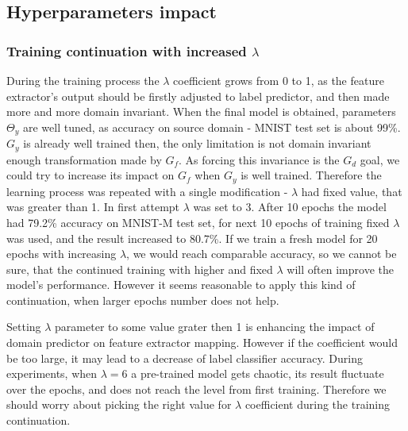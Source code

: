 \documentclass{article}
\begin{document}
\subsection{Hyperparameters impact}

\subsubsection{Training continuation with increased $\lambda$}
During the training process the $\lambda$ coefficient grows from 0 to 1, as the feature extractor's output should be firstly adjusted to label predictor, and then made more and more domain invariant. When the final model is obtained, parameters $\Theta_{y}$ are well tuned, as accuracy on source domain - MNIST test set is about 99\%. $G_{y}$ is already well trained then, the only limitation is not domain invariant enough transformation made by $G_{f}$. As forcing this invariance is the $G_{d}$ goal, we could try to increase its impact on $G_{f}$ when $G_{y}$ is well trained. Therefore the learning process was repeated with a single modification - $\lambda$ had fixed value, that was greater than 1. In first attempt $\lambda$ was set to 3. After 10 epochs the model had 79.2\% accuracy on MNIST-M test set, for next 10 epochs of training fixed $\lambda$ was used, and the result increased to 80.7\%. If we train a fresh model for 20 epochs with increasing $\lambda$, we would reach comparable accuracy, so we cannot be sure, that the continued training with higher and fixed $\lambda$ will often improve the model's performance. However it seems reasonable to apply this kind of continuation, when larger epochs number does not help.
\par
Setting $\lambda$ parameter to some value grater then 1 is enhancing the impact of domain predictor on feature extractor mapping. However if the coefficient would be too large, it may lead to a decrease of label classifier accuracy. During experiments, when $\lambda = 6$ a pre-trained model gets chaotic, its result fluctuate over the epochs, and does not reach the level from first training. Therefore we should worry about picking the right value for $\lambda$ coefficient during the training continuation.
\end{document}
